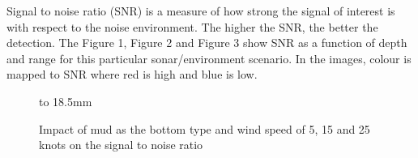 \noindent Signal to noise ratio (SNR) is a measure of how strong the signal of interest is with respect to the noise environment. The higher the SNR, the better the detection. The Figure 1, Figure 2 and Figure 3 show SNR as a function of depth and range for this particular sonar/environment scenario. In the images, colour is mapped to SNR where red is high and blue is low.

\begin{figure}[h]
\centering
{}
\newline
\hbox to 18.5mm{}%
\caption{Impact of mud as the bottom type and wind speed of 5, 15 and 25 knots on the signal to noise ratio}
\end{figure}

